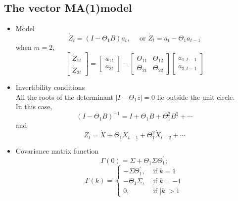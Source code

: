 \documentclass{article}
\begin{document}
\subsection{The vector MA(1)model}
\begin{itemize}
	\item Model
	\begin{equation*}
	\dot{Z}_{t}=\left(I-\Theta_{1} B\right) a_{t}, \quad \text { or } \dot{Z}_{t}=a_{t}-\Theta_{1} a_{t-1}
	\end{equation*}
	when $m = 2$,
	\begin{equation*}
	\left[ \begin{array}{c}{\dot{Z}_{1 t}} \\ {\dot{Z}_{2 t}}\end{array}\right]=\left[ \begin{array}{c}{a_{1 t}} \\ {a_{2 t}}\end{array}\right]-\left[ \begin{array}{cc}{\Theta_{11}} & {\Theta_{12}} \\ {\Theta_{21}} & {\Theta_{22}}\end{array}\right] \left[ \begin{array}{c}{a_{1, t-1}} \\ {a_{2, t-1}}\end{array}\right]
	\end{equation*}
	
	\item Invertibility conditions\\
	
	\noindent All the roots of the determinant $\left|I-\Theta_{1} z\right|=0$ lie outside the unit circle.\\
	
	\noindent In this case,
	\begin{equation*}
	\left(I-\Theta_{1} B\right)^{-1}=I+\Theta_{1} B+\Theta_{1}^{2} B^{2}+\cdots
	\end{equation*}
	and
	\begin{equation*}
	Z_{t}=\dot{X}+\Theta_{1} \dot{X}_{t-1}+\Theta_{1}^{2} \dot{X}_{t-2}+\cdots
	\end{equation*}
	
	\item Covariance matrix function
	\begin{equation*}
	\Gamma(0)=\Sigma+\Theta_{1} \Sigma \Theta_{1}^{\prime};
	\end{equation*}
	\begin{equation*}
	\Gamma(k)=\left\{\begin{array}{ll}{-\Sigma \Theta_{1}^{\prime},} & {\text { if } k=1} \\ {-\Theta_{1} \Sigma,} & {\text { if } k=-1} \\ {0,} & {\text { if }|k|>1}\end{array}\right.
	\end{equation*}
\end{itemize}
\end{document}
